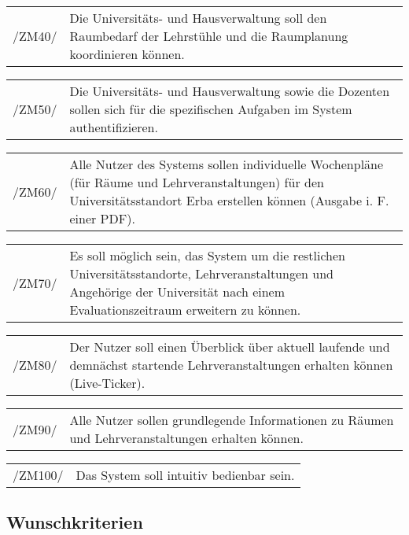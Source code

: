 \begin{tabular}{p{1.5cm}p{14.5cm}}	
	 /ZM40/& Die Universitäts- und Hausverwaltung soll den Raumbedarf der Lehrstühle und die Raumplanung koordinieren können.  \\[0.25cm]
\end{tabular}

\begin{tabular}{p{1.5cm}p{14.5cm}}	
	 /ZM50/& Die Universitäts- und Hausverwaltung sowie die Dozenten sollen sich für die spezifischen Aufgaben im System authentifizieren. \\[0.25cm]
\end{tabular}

\begin{tabular}{p{1.5cm}p{14.5cm}}	
	 /ZM60/& Alle Nutzer des Systems sollen individuelle Wochenpläne (für Räume und Lehrveranstaltungen) für den Universitätsstandort Erba erstellen können (Ausgabe i. F. einer PDF). \\[0.25cm]
\end{tabular}

\begin{tabular}{p{1.5cm}p{14.5cm}}	
	 /ZM70/& Es soll möglich sein, das System um die restlichen Universitätsstandorte, Lehrveranstaltungen und Angehörige der Universität nach einem Evaluationszeitraum erweitern zu können. \\[0.25cm]
\end{tabular}

\begin{tabular}{p{1.5cm}p{14.5cm}}	
	 /ZM80/& Der Nutzer soll einen Überblick über aktuell laufende und demnächst startende Lehrveranstaltungen erhalten können (Live-Ticker). \\[0.25cm]
\end{tabular}

\begin{tabular}{p{1.5cm}p{14.5cm}}	
	 /ZM90/& Alle Nutzer sollen grundlegende Informationen zu Räumen und Lehrveranstaltungen erhalten können. \\[0.25cm]
\end{tabular}

\begin{tabular}{p{1.5cm}p{14.5cm}}	
	 /ZM100/& Das System soll intuitiv bedienbar sein. \\[0.25cm]
\end{tabular}

\subsection{Wunschkriterien }


